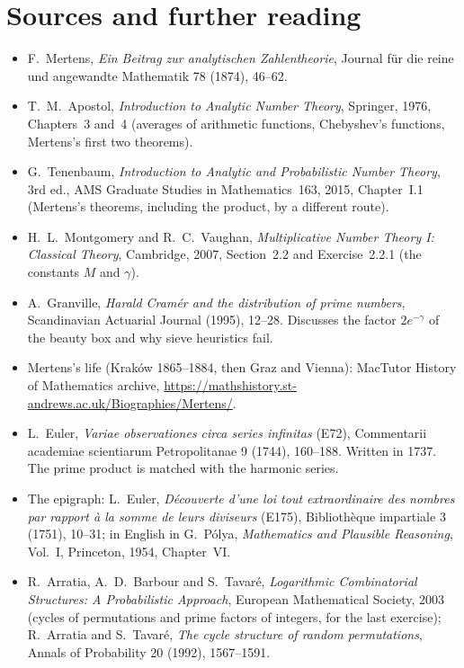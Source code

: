 \section*{Sources and further reading}

\begin{itemize}
\item F.~Mertens, \emph{Ein Beitrag zur analytischen Zahlentheorie}, Journal f\"ur die reine und angewandte Mathematik 78 (1874), 46--62.
\item T.~M.~Apostol, \emph{Introduction to Analytic Number Theory}, Springer, 1976, Chapters~3 and~4 (averages of arithmetic functions, Chebyshev's functions, Mertens's first two theorems).
\item G.~Tenenbaum, \emph{Introduction to Analytic and Probabilistic Number Theory}, 3rd ed., AMS Graduate Studies in Mathematics~163, 2015, Chapter~I.1 (Mertens's theorems, including the product, by a different route).
\item H.~L.~Montgomery and R.~C.~Vaughan, \emph{Multiplicative Number Theory I: Classical Theory}, Cambridge, 2007, Section~2.2 and Exercise~2.2.1 (the constants $M$ and $\gamma$).
\item A.~Granville, \emph{Harald Cram\'er and the distribution of prime numbers}, Scandinavian Actuarial Journal (1995), 12--28. Discusses the factor $2e^{-\gamma}$ of the beauty box and why sieve heuristics fail.
\item Mertens's life (Krak\'ow 1865--1884, then Graz and Vienna): MacTutor History of Mathematics archive, \url{https://mathshistory.st-andrews.ac.uk/Biographies/Mertens/}.
\item L.~Euler, \emph{Variae observationes circa series infinitas} (E72), Commentarii academiae scientiarum Petropolitanae 9 (1744), 160--188. Written in 1737. The prime product is matched with the harmonic series.
\item The epigraph: L.~Euler, \emph{D\'ecouverte d'une loi tout extraordinaire des nombres par rapport \`a la somme de leurs diviseurs} (E175), Biblioth\`eque impartiale 3 (1751), 10--31; in English in G.~P\'olya, \emph{Mathematics and Plausible Reasoning}, Vol.~I, Princeton, 1954, Chapter~VI.
\item R.~Arratia, A.~D.~Barbour and S.~Tavar\'e, \emph{Logarithmic Combinatorial Structures: A Probabilistic Approach}, European Mathematical Society, 2003 (cycles of permutations and prime factors of integers, for the last exercise); R.~Arratia and S.~Tavar\'e, \emph{The cycle structure of random permutations}, Annals of Probability 20 (1992), 1567--1591.
\end{itemize}
